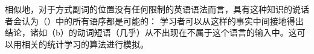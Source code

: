 相似地，对于方式副词的位置没有任何限制的英语语法而言，具有这种知识的说话者会认为（）中的所有语序都是可能的\citep[]{SP2002b}：
\eal
{}
\zl
学习者可以从这样的事实中间接地得出结论，诸如（b）的动词短语（几乎）从不出现在不属于这个语言的输入中。这可以用相关的统计学习的算法进行模拟。

